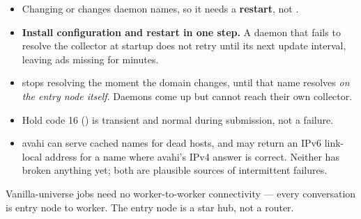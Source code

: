 \begin{itemize}
  \item Changing  or  changes
        daemon names, so it needs a \textbf{restart}, not .
  \item \textbf{Install configuration and restart in one step.} A daemon that
        fails to resolve the collector at startup does not retry until its next
        update interval, leaving ads missing for minutes.
  \item {} stops resolving the moment the
        domain changes, until that name resolves \emph{on the entry node itself}.
        Daemons come up but cannot reach their own collector.
  \item Hold code 16 () is transient and normal
        during  submission, not a failure.
  \item avahi can serve cached names for dead hosts, and  may return
        an IPv6 link-local address for a  name where avahi's IPv4
        answer is correct. Neither has broken anything yet; both are plausible
        sources of intermittent failures.
\end{itemize}

Vanilla-universe jobs need no worker-to-worker connectivity --- every
conversation is entry node to worker. The entry node is a star hub, not a router.

